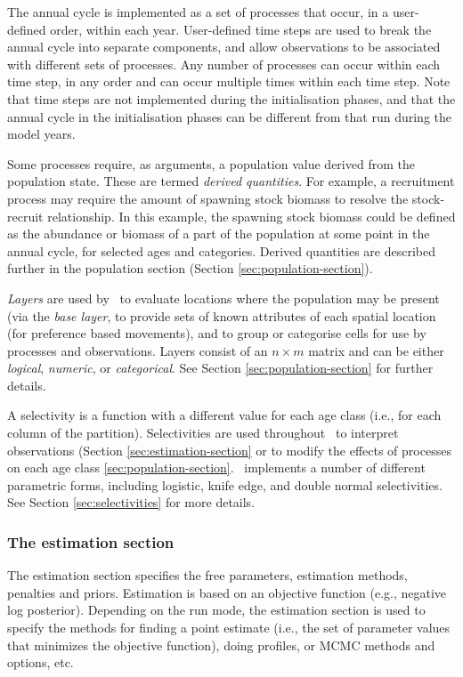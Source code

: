 The annual cycle is implemented as a set of processes that occur, in a user-defined order, within each year. User-defined time steps are used to break the annual cycle into separate components, and allow observations to be associated with different sets of processes. Any number of processes can occur within each time step, in any order and can occur multiple times within each time step. Note that time steps are not implemented during the initialisation phases, and that the annual cycle in the initialisation phases can be different from that run during the model years.

Some processes require, as arguments, a population value derived from the population state. These are termed \emph{derived quantities}. For example, a recruitment process may require the amount of spawning stock biomass to resolve the stock-recruit relationship. In this example, the spawning stock biomass could be defined as the abundance or biomass of a part of the population at some point in the annual cycle, for selected ages and categories. Derived quantities are described further in the population section (Section \ref{sec:population-section}).

\emph{Layers} are used by \SPM\ to evaluate locations where the population may be present (via the \emph{base layer}, to provide sets of known attributes of each spatial location (for preference based movements), and to group or categorise cells for use by processes and observations. Layers consist of an $n \times m$ matrix and can be either \emph{logical}, \emph{numeric}, or \emph{categorical}. See Section \ref{sec:population-section} for further details.

A selectivity is a function with a different value for each age class (i.e., for each column of the partition). Selectivities are used throughout \SPM\ to interpret observations (Section \ref{sec:estimation-section} or to modify the effects of processes on each age class \ref{sec:population-section}. \SPM\ implements a number of different parametric forms, including logistic, knife edge, and double normal selectivities. See Section \ref{sec:selectivities} for more details.

\subsubsection{The estimation section}

The estimation section specifies the free parameters, estimation methods, penalties and priors. Estimation is based on an objective function (e.g., negative log posterior). Depending on the run mode, the estimation section is used to specify the methods for finding a point estimate (i.e., the set of parameter values that minimizes the objective function), doing profiles, or MCMC methods and options, etc.

